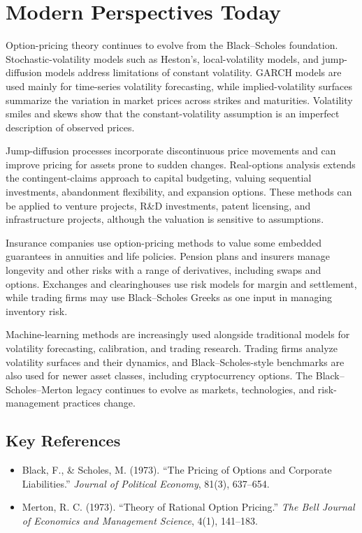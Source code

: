 \section{Modern Perspectives Today}
Option-pricing theory continues to evolve from the Black--Scholes foundation.
Stochastic-volatility models such as Heston's, local-volatility models, and
jump-diffusion models address limitations of constant volatility. GARCH models
are used mainly for time-series volatility forecasting, while implied-volatility
surfaces summarize the variation in market prices across strikes and maturities.
Volatility smiles and skews show that the constant-volatility assumption is an
imperfect description of observed prices.

Jump-diffusion processes incorporate discontinuous price movements and can improve
pricing for assets prone to sudden changes. Real-options analysis extends the
contingent-claims approach to capital budgeting, valuing sequential investments,
abandonment flexibility, and expansion options. These methods can be applied to
venture projects, R\&D investments, patent licensing, and infrastructure projects,
although the valuation is sensitive to assumptions.

Insurance companies use option-pricing methods to value some embedded guarantees
in annuities and life policies. Pension plans and insurers manage longevity and
other risks with a range of derivatives, including swaps and options. Exchanges
and clearinghouses use risk models for margin and settlement, while trading firms
may use Black--Scholes Greeks as one input in managing inventory risk.

Machine-learning methods are increasingly used alongside traditional models for
volatility forecasting, calibration, and trading research. Trading firms analyze
volatility surfaces and their dynamics, and Black--Scholes-style benchmarks are
also used for newer asset classes, including cryptocurrency options. The
Black--Scholes--Merton legacy continues to evolve as markets, technologies, and
risk-management practices change.

\subsection*{Key References}
\begin{itemize}
    \item Black, F., \& Scholes, M. (1973). ``The Pricing of Options and Corporate Liabilities.'' \textit{Journal of Political Economy}, 81(3), 637--654.
    \item Merton, R. C. (1973). ``Theory of Rational Option Pricing.'' \textit{The Bell Journal of Economics and Management Science}, 4(1), 141--183.
\end{itemize}
